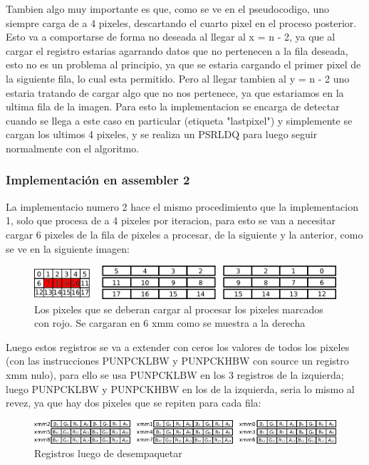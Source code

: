\documentclass[a4paper]{article}
\begin{document}
Tambien algo muy importante es que, como se ve en el pseudocodigo, uno siempre carga de a 4 pixeles, descartando el cuarto pixel en el proceso posterior. Esto va a comportarse de forma no deseada al llegar al x = n - 2, ya que al cargar el registro estarias agarrando datos que no pertenecen a la fila deseada, esto no es un problema al principio, ya que se estaria cargando el primer pixel de la siguiente fila, lo cual esta permitido. Pero al llegar tambien al y = n - 2 uno estaria tratando de cargar algo que no nos pertenece, ya que estariamos en la ultima fila de la imagen. Para esto la implementacion se encarga de detectar cuando se llega a este caso en particular (etiqueta "lastpixel") y simplemente se cargan los ultimos 4 pixeles, y se realiza un PSRLDQ para luego seguir normalmente con el algoritmo.

\subsubsection{Implementación en assembler 2}

La implementacio numero 2 hace el mismo procedimiento que la implementacion 1, solo que procesa de a 4 pixeles por iteracion, para esto se van a necesitar cargar 6 pixeles de la fila de pixeles a procesar, de la siguiente y la anterior, como se ve en la siguiente imagen:

\begin{figure}[H]
\centering
\includegraphics[scale=0.8]{imagenes/blur2pixels.png}
\caption{Los pixeles que se deberan cargar al procesar los pixeles marcados con rojo. Se cargaran en 6 xmm como se muestra a la derecha}
\label{b2pixels}
\end{figure}

Luego estos registros se va a extender con ceros los valores de todos los pixeles (con las instrucciones PUNPCKLBW y PUNPCKHBW con source un registro xmm nulo), para ello se usa PUNPCKLBW en los 3 registros de la izquierda; luego PUNPCKLBW y PUNPCKHBW en los de la izquierda, seria lo mismo al revez, ya que hay dos pixeles que se repiten para cada fila:

\begin{figure}[H]
\centering
\includegraphics[scale=0.8]{imagenes/blur2unpack.png}
\caption{Registros luego de desempaquetar}
\label{b2unpack}
\end{figure}
\end{document}
